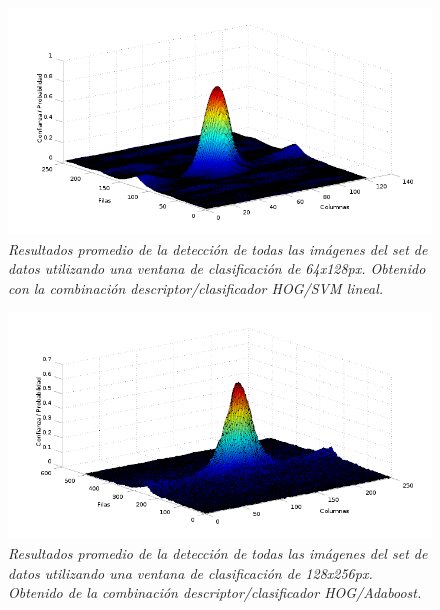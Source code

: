 \begin{figure}[H]
  \centering
  \includegraphics[scale=.6]{images/mean/svm/64}
  \caption{\em  Resultados promedio de la detección de todas las imágenes del set de datos utilizando una ventana de clasificación de 64x128px. Obtenido con la combinación descriptor/clasificador HOG/SVM lineal.}  
  \label{fig:gp4}
\end{figure}

\begin{figure}[H]
  \centering
  \includegraphics[scale=.6]{images/mean/boost/128}
  \caption{\em  Resultados promedio de la detección de todas las imágenes del set de datos utilizando una ventana de clasificación de 128x256px. Obtenido de la combinación descriptor/clasificador HOG/Adaboost.}  
  \label{fig:gp5}
\end{figure}

